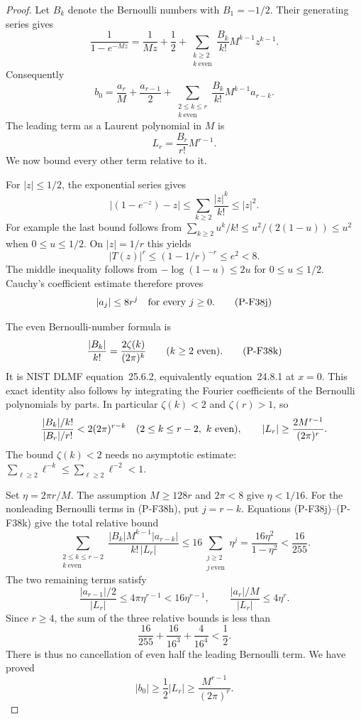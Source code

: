 \documentclass[11pt,a4paper]{article}
\begin{document}
\begin{proof}
Let $B_k$ denote the Bernoulli numbers with $B_1=-1/2$.
Their generating series gives
\[
 \frac1{1-e^{-Mz}}
 =\frac1{Mz}+\frac12+
      \sum_{\substack{k\ge2\\ k\ \mathrm{even}}}
                     \frac{B_k}{k!}M^{k-1}z^{k-1}.
\]
Consequently
\[
 b_0=\frac{a_r}{M}+\frac{a_{r-1}}2
       +\sum_{\substack{2\le k\le r\\ k\ \mathrm{even}}}
                 \frac{B_k}{k!}M^{k-1}a_{r-k}.
 \tag{P-F38h}
\]
The leading term as a Laurent polynomial in $M$ is
\[
             L_r=\frac{B_r}{r!}M^{r-1}.
 \tag{P-F38i}
\]
We now bound every other term relative to it.

For $|z|\le1/2$, the exponential series gives
\[
 |(1-e^{-z})-z|
       \le\sum_{k\ge2}\frac{|z|^k}{k!}\le |z|^2.
\]
For example the last bound follows from
$\sum_{k\ge2}u^k/k!\le u^2/(2(1-u))\le u^2$
when $0\le u\le1/2$.
On $|z|=1/r$ this yields
\[
 |T(z)|^r\le(1-1/r)^{-r}\le e^2<8.
\]
The middle inequality follows from
$-\log(1-u)\le2u$ for $0\le u\le1/2$.
Cauchy's coefficient estimate therefore proves
\[
                         |a_j|\le8r^j
                         \quad\hbox{for every }j\ge0.
 \tag{P-F38j}
\]

The even Bernoulli-number formula is
\[
 \frac{|B_k|}{k!}=\frac{2\zeta(k)}{(2\pi)^k}
           \qquad(k\ge2\ \hbox{even}).
 \tag{P-F38k}
\]
It is NIST DLMF equation~25.6.2, equivalently equation~24.8.1
at $x=0$. This exact identity also follows by integrating the
Fourier coefficients of the Bernoulli polynomials by parts.
In particular $\zeta(k)<2$ and $\zeta(r)>1$, so
\[
 \frac{|B_k|/k!}{|B_r|/r!}<2(2\pi)^{r-k}
        \quad(2\le k\le r-2,\ k\ \hbox{even}),\qquad
 |L_r|\ge\frac{2M^{r-1}}{(2\pi)^r}.
\]
The bound $\zeta(k)<2$ needs no asymptotic estimate:
$\sum_{\ell\ge2}\ell^{-k}\le\sum_{\ell\ge2}\ell^{-2}<1$.

Set $\eta=2\pi r/M$. The assumption $M\ge128r$ and
$2\pi<8$ give $\eta<1/16$. For the nonleading Bernoulli
terms in (P-F38h), put $j=r-k$. Equations (P-F38j)--(P-F38k)
give the total relative bound
\[
 \sum_{\substack{2\le k\le r-2\\ k\ \mathrm{even}}}
 \frac{|B_k|M^{k-1}|a_{r-k}|}{k!\,|L_r|}
       \le16\sum_{\substack{j\ge2\\ j\ \mathrm{even}}}\eta^j
       =\frac{16\eta^2}{1-\eta^2}
       <\frac{16}{255}.
 \tag{P-F38l}
\]
The two remaining terms satisfy
\[
 \frac{|a_{r-1}|/2}{|L_r|}
        \le4\pi\eta^{r-1}<16\eta^{r-1},
 \qquad
 \frac{|a_r|/M}{|L_r|}\le4\eta^r.
 \tag{P-F38m}
\]
Since $r\ge4$, the sum of the three relative bounds is
less than
\[
        \frac{16}{255}+\frac{16}{16^3}
                          +\frac4{16^4}<\frac12.
\]
There is thus no cancellation of even half the leading
Bernoulli term. We have proved
\[
              |b_0|\ge\frac12|L_r|
                         \ge\frac{M^{r-1}}{(2\pi)^r}.
 \tag{P-F38n}
\]


\end{proof}
\end{document}
